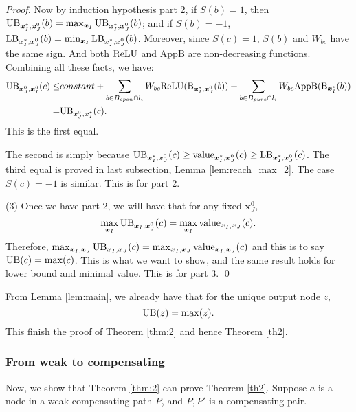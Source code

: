 \begin{proof}
				Now by induction hypothesis part 2, if $S(b)=1$, then $\mathrm{UB}_{\boldsymbol{x}^*_I,\boldsymbol{x}^0_J}(b)=\max_{\boldsymbol{x}_I}\mathrm{UB}_{\boldsymbol{x}^*_I,\boldsymbol{x}^0_J}(b)$; and if $S(b)=-1$, $\mathrm{LB}_{\boldsymbol{x}^*_I,\boldsymbol{x}^0_J}(b)=\min_{\boldsymbol{x}_I}\mathrm{LB}_{\boldsymbol{x}^*_I,\boldsymbol{x}^0_J}(b)$. Moreover, since $S(c)=1$, $S(b)$ and $W_{bc}$ have the same sign. And both $\mathrm{ReLU}$ and $\mathrm{AppB}$ are non-decreasing functions. Combining all these facts, we have:\begin{align*}
					\mathrm{UB}_{\boldsymbol{x}^0_J,\boldsymbol{x}^0_I}(c)\leq 
					&constant + \sum_{b\in B_{open}\cap l_i} W_{bc}\mathrm{ReLU}(\mathrm{B}_{\boldsymbol{x}^*_I,\boldsymbol{x}^0_J}(b)) + \sum_{b\in B_{pure}\cap l_{i}} W_{bc} \mathrm{AppB}(\mathrm{B}_{\boldsymbol{x}^*_I}(b))\\
					= & \mathrm{UB}_{\boldsymbol{x}^0_J,\boldsymbol{x}^*_I}(c). 
				\end{align*}  This is the first equal.
				
				The second is simply because $\mathrm{UB}_{\boldsymbol{x}^*_I,\boldsymbol{x}^0_J}(c)\geq {\textrm{value}}_{\boldsymbol{x}^*_I,\boldsymbol{x}^0_J}(c)\geq\mathrm{LB}_{\boldsymbol{x}^*_I,\boldsymbol{x}^0_J}(c)$.	The third equal is proved in last subsection, Lemma \ref{lem:reach_max_2}. The case $S(c)=-1$ is similar. This is for part 2.
				
				(3) Once we have part 2, we will have that for any fixed $\boldsymbol{x}^0_J$, $$\max_{\boldsymbol{x}_I} \mathrm{UB}_{\boldsymbol{x}_I,\boldsymbol{x}^0_J}(c)= \max_{\boldsymbol{x}_I} {\textrm{value}}_{\boldsymbol{x}_I,\boldsymbol{x}_J}(c).$$ Therefore, $\max_{\boldsymbol{x}_I,\boldsymbol{x}_J} \mathrm{UB}_{\boldsymbol{x}_I,\boldsymbol{x}_J}(c)= \max_{\boldsymbol{x}_I,\boldsymbol{x}_J} {\textrm{value}}_{\boldsymbol{x}_I,\boldsymbol{x}_J}(c)$ and this is to say $\mathrm{UB}(c)=\max(c)$. This is what we want to show, and the same result holds for lower bound and minimal value. This is for part 3. \qed

			\end{proof}
			
			From Lemma \ref{lem:main}, we already have that for the unique output node $z$, $$\mathrm{UB}(z)=\max(z).$$ This finish the proof of Theorem \ref{thm:2} and hence Theorem \ref{th2}.
			
			
			\subsubsection*{From weak to compensating}
			
			Now, we show that Theorem \ref{thm:2} can prove Theorem \ref{th2}. Suppose $a$ is a node in a weak compensating path $P$, and $P,P'$ is a compensating pair.
			
